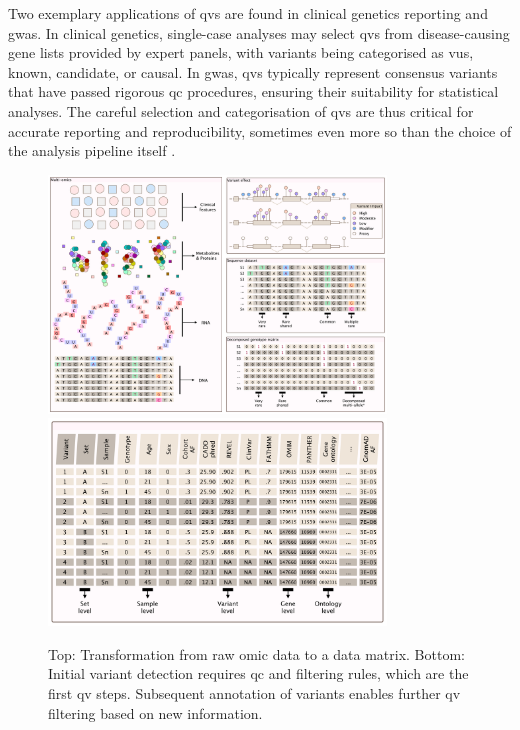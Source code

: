 Two exemplary applications of \ac{qv}s are found in clinical genetics reporting and \ac{gwas}. In clinical genetics, single-case analyses may select \ac{qv}s from disease-causing gene lists provided by expert panels, with variants being categorised as \ac{vus}, known, candidate, or causal. In \ac{gwas}, \ac{qv}s typically represent consensus variants that have passed rigorous \ac{qc} procedures, ensuring their suitability for statistical analyses. The careful selection and categorisation of \ac{qv}s are thus critical for accurate reporting and reproducibility, sometimes even more so than the choice of the analysis pipeline itself \cite{olson2023variant}.

\begin{figure}[h!]
    \centering
   \includegraphics[width=0.8\textwidth]{./images/candidate_variants_sequence_to_matrix_pink.pdf}
      \includegraphics[width=0.8\textwidth]{./images/candidate_variants_sequence_annotation_pink.pdf}
    \caption{
Top: Transformation from raw omic data to a data matrix. Bottom: Initial variant detection requires \ac{qc} and filtering rules, which are the first \ac{qv} steps. Subsequent annotation of variants enables further \ac{qv} filtering based on new information.    
    }
        \label{fig:candidate_variants_sequence_annotation}
\end{figure}

